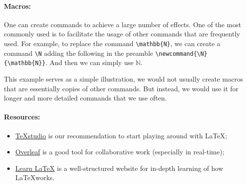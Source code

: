 \documentclass[10pt]{article}
\newcommand{\N}{\mathbb{N}}
\begin{document}
\paragraph*{Macros:}
One can create commands to achieve a large number of effects. One of the most commonly used is to facilitate the usage of other commands that are frequently used. For example, to replace the command \verb|\mathbb{N}|, we can create a command \verb|\N| adding the following in the preamble \verb|\newcommand{\N}{\mathbb{N}}|. And then we can simply use $\N$.

This example serves as a simple illustration, we would not usually create macros that are essentially copies of other commands.
But instead, we would use it for longer and more detailed commands that we use often.

\paragraph*{Resources:}
\begin{itemize}

    \item \href{https://www.texstudio.org/}{TeXstudio} is our recommendation to start playing around with \LaTeX;
    \item \href{https://www.overleaf.com/}{Overleaf} is a good tool for collaborative work (especially in real-time);
    \item \href{https://www.learnlatex.org/en/}{Learn \LaTeX} is a well-structured website for in-depth learning of how \LaTeX works.
\end{itemize}
\end{document}
